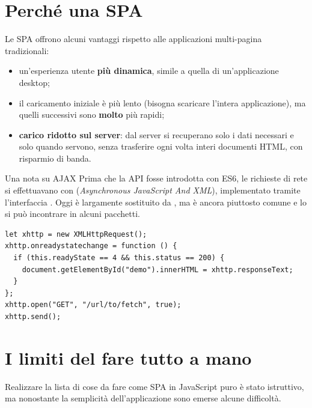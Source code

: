 \section{Perché una SPA}

Le SPA offrono alcuni vantaggi rispetto alle applicazioni multi-pagina
tradizionali:

\begin{itemize}
  \item un'esperienza utente \textbf{più dinamica}, simile a quella di
        un'applicazione desktop;
  \item il caricamento iniziale è più lento (bisogna scaricare l'intera
        applicazione), ma quelli successivi sono \textbf{molto} più rapidi;
  \item \textbf{carico ridotto sul server}: dal server si recuperano solo i dati
        necessari e solo quando servono, senza trasferire ogni volta interi
        documenti HTML, con risparmio di banda.
\end{itemize}

\begin{infobox}{{Una nota su AJAX}}
  Prima che la  API fosse introdotta con ES6, le richieste di rete
  si effettuavano con  (\textit{Asynchronous JavaScript And XML}),
  implementato tramite l'interfaccia . Oggi
   è largamente sostituito da , ma è ancora
  piuttosto comune e lo si può incontrare in alcuni pacchetti.

\begin{lstlisting}[style=js]
let xhttp = new XMLHttpRequest();
xhttp.onreadystatechange = function () {
  if (this.readyState == 4 && this.status == 200) {
    document.getElementById("demo").innerHTML = xhttp.responseText;
  }
};
xhttp.open("GET", "/url/to/fetch", true);
xhttp.send();
\end{lstlisting}
\end{infobox}

\section{I limiti del fare tutto a mano}

Realizzare la lista di cose da fare come SPA in JavaScript puro è stato
istruttivo, ma nonostante la semplicità dell'applicazione sono emerse alcune
difficoltà.

